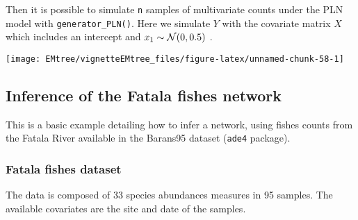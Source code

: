 Then it is possible to simulate \texttt{n} samples of multivariate
counts under the PLN model with \texttt{generator\_PLN()}. Here we simulate $Y$ with the covariate matrix $X$ which includes an intercept and $x_1 \sim \mathcal{N}(0,0.5)$ .

\begin{Shaded}
\begin{Highlighting}[]
\StringTok{ }
\StringTok{ }\NormalTok{(}\NormalTok{,}\NormalTok{,}\NormalTok{))}
\StringTok{ }\OperatorTok{\$}\StringTok{ } \NormalTok{)}
\end{Highlighting}
\end{Shaded}

\begin{center}\texttt{[image: EMtree/vignetteEMtree\_files/figure-latex/unnamed-chunk-58-1]} \end{center}

\subsection{Inference of the Fatala fishes
network}\label{inference-of-the-fatala-fishes-network}

This is a basic example detailing how to infer a network, using fishes
counts from the Fatala River available in the Barans95 dataset (\texttt{ade4}
package).

\subsubsection{Fatala fishes dataset}\label{fatala-fishes-dataset}

The data is composed of 33 species abundances measures in 95 samples.
The available covariates are the site and date of the samples.

\begin{Shaded}
\begin{Highlighting}[]
\StringTok{ }\OperatorTok{\$}
\StringTok{ }\OperatorTok{\$}
\StringTok{ }
\StringTok{ }
\end{Highlighting}
\end{Shaded}

